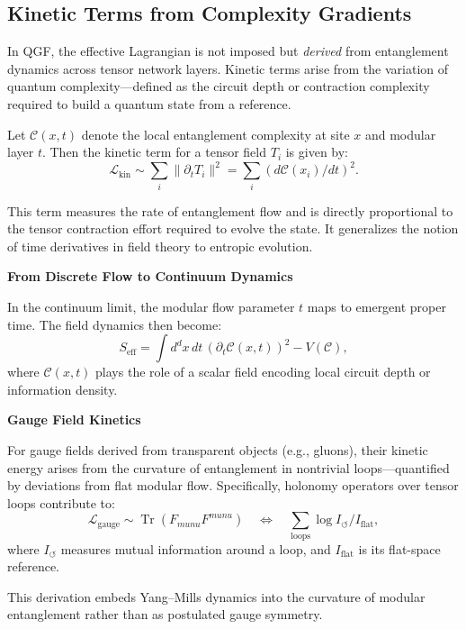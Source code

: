 \documentclass[11pt]{article}
\DeclareMathOperator*{\Tr}{Tr}
\def\mu{mu}
\def\nu{nu}
\def\frac#1#2{#1/#2}
\def\left{}
\def\right{}
\begin{document}
\subsection{Kinetic Terms from Complexity Gradients}

In QGF, the effective Lagrangian is not imposed but \emph{derived} from entanglement dynamics across tensor network layers. Kinetic terms arise from the variation of quantum complexity—defined as the circuit depth or contraction complexity required to build a quantum state from a reference.

Let \( \mathcal{C}(x, t) \) denote the local entanglement complexity at site \( x \) and modular layer \( t \). Then the kinetic term for a tensor field \( T_i \) is given by:
\[
\mathcal{L}_{\text{kin}} \sim \sum_i \left\| \partial_t T_i \right\|^2 = \sum_i \left( \frac{d\mathcal{C}(x_i)}{dt} \right)^2.
\]

This term measures the rate of entanglement flow and is directly proportional to the tensor contraction effort required to evolve the state. It generalizes the notion of time derivatives in field theory to entropic evolution.

\vspace{0.5em}
\noindent\textbf{From Discrete Flow to Continuum Dynamics}

In the continuum limit, the modular flow parameter \( t \) maps to emergent proper time. The field dynamics then become:
\[
S_{\text{eff}} = \int d^d x \, dt \, \left( \partial_t \mathcal{C}(x,t) \right)^2 - V(\mathcal{C}),
\]
where \( \mathcal{C}(x,t) \) plays the role of a scalar field encoding local circuit depth or information density.

\vspace{0.5em}
\noindent\textbf{Gauge Field Kinetics}

For gauge fields derived from transparent objects (e.g., gluons), their kinetic energy arises from the curvature of entanglement in nontrivial loops—quantified by deviations from flat modular flow. Specifically, holonomy operators over tensor loops contribute to:
\[
\mathcal{L}_{\text{gauge}} \sim \Tr \left( F_{\mu\nu} F^{\mu\nu} \right) \quad \Leftrightarrow \quad \sum_{\text{loops}} \log \frac{I_{\circlearrowleft}}{I_{\text{flat}}},
\]
where \( I_{\circlearrowleft} \) measures mutual information around a loop, and \( I_{\text{flat}} \) is its flat-space reference.

This derivation embeds Yang–Mills dynamics into the curvature of modular entanglement rather than as postulated gauge symmetry.
\end{document}
